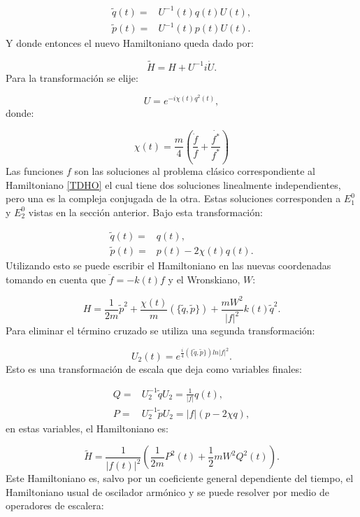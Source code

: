 \documentclass[a4paper,10pt]{report}
\begin{document}
\begin{align}
\tilde{q}(t) =& U^{-1}(t)q(t)U(t),\\
\tilde{p}(t) =& U^{-1}(t)p(t)U(t).
\end{align} Y donde entonces el nuevo Hamiltoniano queda dado por:

\begin{equation}
\tilde{H} = H + U^{-1}i\dot{U}.
\end{equation} Para la transformación se elije:

\begin{equation}
U = e^{-i\chi(t)q^2(t)},
\end{equation} donde:

\begin{equation}
\chi(t) = \frac{m}{4}(\frac{\dot{f}}{f}+\frac{\dot{f^*}}{f^*})
\end{equation} Las funciones $f$ son las soluciones al problema clásico correspondiente al Hamiltoniano \ref{TDHO} el cual tiene dos soluciones linealmente independientes, pero una es la compleja conjugada de la otra. Estas soluciones corresponden a $E_1^0$  y $E_2^0$ vistas en la sección anterior. Bajo esta transformación:

\begin{align}
\tilde{q}(t)=&q(t),\\
\tilde{p}(t)=&p(t)-2\chi(t)q(t).
\end{align}Utilizando esto se puede escribir el Hamiltoniano en las nuevas coordenadas tomando en cuenta que $\ddot{f}= -k(t)f$ y el Wronskiano, $W$:

\begin{equation}
 H = \frac{1}{2m}\tilde{p}^2 + \frac{\chi(t)}{m}(\{\tilde{q},\tilde{p}\}) + \frac{mW^2}{|f|^2}k(t)\tilde{q}^2.
\end{equation}Para eliminar el término cruzado se utiliza una segunda transformación:

\begin{equation}
U_2(t)=e^{\frac{i}{4}(\{\tilde{q},\tilde{p}\})ln|f|^2}.
\end{equation}Esto es una transformación de escala que deja como variables finales:

\begin{align}
Q=&U_2^{-1}\tilde{q}U_2 =\frac{1}{|f|}q(t),\\
P=&U_2^{-1}\tilde{p}U_2 = |f|(p-2\chi q), 
\end{align} en estas variables, el Hamiltoniano es:

\begin{equation}\label{QTDHO}
\tilde{H} = \frac{1}{|f(t)|^2}(\frac{1}{2m}P^2(t)+\frac{1}{2}mW^2Q^2(t)).
\end{equation}Este Hamiltoniano es, salvo por un coeficiente general dependiente del tiempo, el Hamiltoniano usual de oscilador armónico y se puede resolver por medio de operadores de escalera:
\end{document}
